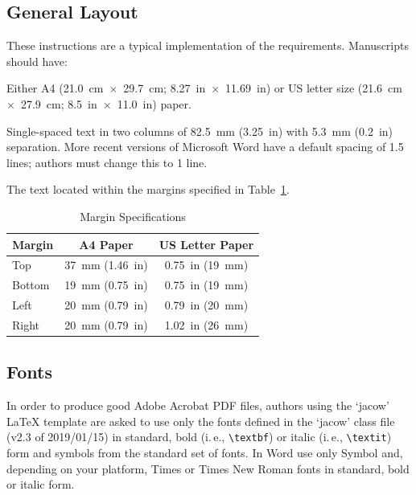 \documentclass[letterpaper,
               nospread,     %
               ]{jacow}
\begin{document}
\subsection{General Layout}

These instructions are a typical implementation of the
requirements. Manuscripts should have:
\begin{Itemize}
    \item  Either A4 (\SI{21.0}{cm}~$\times$~\SI{29.7}{cm}; \SI{8.27}{in}~$\times$~\SI{11.69}{in}) or US
           letter size (\SI{21.6}{cm}~$\times$~\SI{27.9}{cm}; \SI{8.5}{in}~$\times$~\SI{11.0}{in}) paper.
    \item  Single-spaced text in two columns of \SI{82.5}{mm} (\SI{3.25}{in}) with \SI{5.3}{mm}
           (\SI{0.2}{in}) separation. More recent versions of Microsoft Word have a default spacing of 1.5 lines;
           authors must change this to 1 line.
    \item  The text located within the margins specified in Table~\ref{tab:margins}.
\end{Itemize}
\begin{table}[!hbt]
   \centering
   \caption{Margin Specifications}
   \begin{tabular}{lcc}
       \toprule
       \textbf{Margin} & \textbf{A4 Paper}                      & \textbf{US Letter Paper} \\
       \midrule
           Top         & \SI{37}{mm} (\SI{1.46}{in})            & \SI{0.75}{in} (\SI{19}{mm})        \\ %
          Bottom       & \SI{19}{mm} (\SI{0.75}{in})            & \SI{0.75}{in} (\SI{19}{mm})        \\ %
           Left        & \SI{20}{mm} (\SI{0.79}{in})            & \SI{0.79}{in} (\SI{20}{mm})        \\ %
           Right       & \SI{20}{mm} (\SI{0.79}{in})            & \SI{1.02}{in} (\SI{26}{mm})        \\
       \bottomrule
   \end{tabular}
   \label{tab:margins}
\end{table}

\subsection{Fonts}

In order to produce good Adobe Acrobat PDF files, authors
using the `jacow' \LaTeX{} template are asked to use only the fonts
defined in the ‘jacow’ class file (v2.3 of 2019/01/15) in standard, 
bold (i.\,e., \verb|\textbf|) or italic (i.\,e., \verb|\textit|) form and
symbols from the standard set of fonts. In Word use only
Symbol and, depending on your platform, Times or Times New Roman
fonts in standard, bold or italic form.
\end{document}
